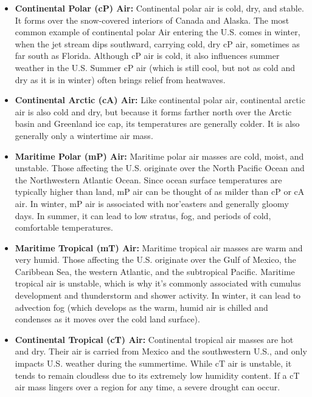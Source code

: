 \documentclass[12pt,oneside]{book}
\providecommand{\tightlist}{%
  \setlength{\itemsep}{0pt}\setlength{\parskip}{0pt}}
\begin{document}
\begin{itemize}
\tightlist
\item
  \textbf{Continental Polar (cP) Air:} Continental polar air is cold,
  dry, and stable. It forms over the snow-covered interiors of Canada
  and Alaska. The most common example of continental polar Air entering
  the U.S. comes in winter, when the jet stream dips southward, carrying
  cold, dry cP air, sometimes as far south as Florida. Although cP air
  is cold, it also influences summer weather in the U.S. Summer cP air
  (which is still cool, but not as cold and dry as it is in winter)
  often brings relief from heatwaves.
\item
  \textbf{Continental Arctic (cA) Air:} Like continental polar air,
  continental arctic air is also cold and dry, but because it forms
  farther north over the Arctic basin and Greenland ice cap, its
  temperatures are generally colder. It is also generally only a
  wintertime air mass.
\item
  \textbf{Maritime Polar (mP) Air:} Maritime polar air masses are cold,
  moist, and unstable. Those affecting the U.S. originate over the North
  Pacific Ocean and the Northwestern Atlantic Ocean. Since ocean surface
  temperatures are typically higher than land, mP air can be thought of
  as milder than cP or cA air. In winter, mP air is associated with
  nor'easters and generally gloomy days. In summer, it can lead to low
  stratus, fog, and periods of cold, comfortable temperatures.
\item
  \textbf{Maritime Tropical (mT) Air:} Maritime tropical air masses are
  warm and very humid. Those affecting the U.S. originate over the Gulf
  of Mexico, the Caribbean Sea, the western Atlantic, and the
  subtropical Pacific. Maritime tropical air is unstable, which is why
  it's commonly associated with cumulus development and thunderstorm and
  shower activity. In winter, it can lead to advection fog (which
  develops as the warm, humid air is chilled and condenses as it moves
  over the cold land surface).
\item
  \textbf{Continental Tropical (cT) Air:} Continental tropical air
  masses are hot and dry. Their air is carried from Mexico and the
  southwestern U.S., and only impacts U.S. weather during the
  summertime. While cT air is unstable, it tends to remain cloudless due
  to its extremely low humidity content. If a cT air mass lingers over a
  region for any time, a severe drought can occur.
\end{itemize}
\end{document}
